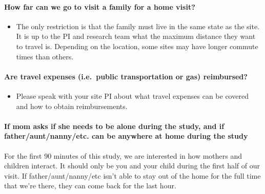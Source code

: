 \documentclass[
  12pt,
]{book}
\providecommand{\tightlist}{%
  \setlength{\itemsep}{0pt}\setlength{\parskip}{0pt}}
\begin{document}
\hypertarget{how-far-can-we-go-to-visit-a-family-for-a-home-visit}{%
\paragraph*{How far can we go to visit a family for a home visit?}\label{how-far-can-we-go-to-visit-a-family-for-a-home-visit}}

\begin{itemize}
\tightlist
\item
  The only restriction is that the family must live in the same state as the site. It is up to the PI and research team what the maximum distance they want to travel is. Depending on the location, some sites may have longer commute times than others.
\end{itemize}

\hypertarget{are-travel-expenses-i.e.-public-transportation-or-gas-reimbursed}{%
\paragraph*{Are travel expenses (i.e.~public transportation or gas) reimbursed?}\label{are-travel-expenses-i.e.-public-transportation-or-gas-reimbursed}}

\begin{itemize}
\tightlist
\item
  Please speak with your site PI about what travel expenses can be covered and how to obtain reimbursements.
\end{itemize}

\hypertarget{if-mom-asks-if-she-needs-to-be-alone-during-the-study-and-if-fatherauntnannyetc.-can-be-anywhere-at-home-during-the-study}{%
\paragraph*{If mom asks if she needs to be alone during the study, and if father/aunt/nanny/etc. can be anywhere at home during the study}\label{if-mom-asks-if-she-needs-to-be-alone-during-the-study-and-if-fatherauntnannyetc.-can-be-anywhere-at-home-during-the-study}}

For the first 90 minutes of this study, we are interested in how mothers and children interact. It should only be you and your child during the first half of our visit. If father/aunt/nanny/etc isn't able to stay out of the home for the full time that we're there, they can come back for the last hour.
\end{document}
